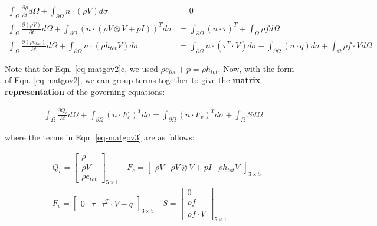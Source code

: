 \documentclass[11pt, letterpaper]{report}
\begin{document}
\begin{subequations}\label{eq-matgov2}
   \begin{align}
      \int_{\Omega}\frac{\partial \rho}{\partial t}d\Omega + \int_{\partial \Omega} n \cdot (\rho V)
      d\sigma &= 0 \\ \int_\Omega \frac{\partial(\rho V)}{\partial t}d\Omega + \int_{\partial\Omega}
      \left(n \cdot (\rho V \mathop{\otimes} V + pI)\right)^T d\sigma & = \int_{\partial\Omega} (n
      \cdot \tau)^T + \int_\Omega \rho f d\Omega \\ \int_\Omega\frac{\partial(\rho e_{tot})}{\partial
      t} d\Omega + \int_{\partial\Omega} n \cdot (\rho h_{tot} V) d\sigma & = \int_{\partial\Omega} n
      \cdot (\tau^T \cdot V) d\sigma - \int_{\partial\Omega}(n \cdot q) d\sigma  + \int_\Omega \rho f
      \cdot V d\Omega 
   \end{align}
\end{subequations}

Note that for Eqn. \ref{eq-matgov2}c, we used $\rho e_{tot} + p = \rho h_{tot}$. Now, with the form
of Eqn. \ref{eq-matgov2}, we can group terms together to give the {\bf matrix representation} of the
governing equations:

\begin{align}\label{eq-matgov3}
   \int_{\Omega}\frac{\partial Q_c}{\partial t}d\Omega +  \int_{\partial \Omega} (n \cdot F_c)^T
   d\sigma = \int_{\partial \Omega} (n \cdot F_v)^T d\sigma + \int_{\Omega} S d\Omega
\end{align}

where the terms in Eqn. \ref{eq-matgov3} are as follows:

\begin{align*}
   &Q_c = \begin{bmatrix} 
      \rho \\
      \rho V \\
      \rho e_{tot}
   \end{bmatrix}_{5\times1} \quad 
   F_c = \begin{bmatrix} \rho V & \rho V\mathop{\otimes}V + pI & \rho h_{tot} V
      \end{bmatrix}_{3\times5} \\
      &F_v = \begin{bmatrix}0 & \tau & \tau^T \cdot V -
   q\end{bmatrix}_{3\times5} \quad S = \begin{bmatrix}
      0 \\
      \rho f \\
      \rho f \cdot V
      \end{bmatrix}_{5\times1}
\end{align*}
\end{document}
